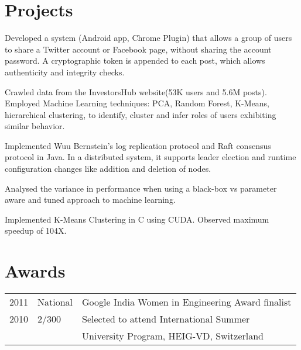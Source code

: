 \documentclass[]{deedy-resume-openfont}
\begin{document}
\begin{minipage}[t]{0.63\textwidth}
\section{Projects}
{\fontsize{9}{11}\selectfont
{}
Developed a system (Android app, Chrome Plugin) that
allows
a
group
of
users
to
share
a
Twitter
account
or
Facebook
page,
without
sharing
the
account
password.
A
cryptographic
token
is
appended
to
each
post,
which
allows authenticity and integrity checks.
\sectionsep

 Crawled
data
from
the
InvestorsHub
website(53K users and 5.6M posts).
Employed
Machine
Learning
techniques:
PCA,
Random
Forest,
K-Means,
hierarchical
clustering,
to
identify,
cluster
and
infer
roles
of
users
exhibiting
similar
behavior.

\sectionsep

Implemented Wuu Bernstein’s log replication protocol and Raft consensus protocol in Java. In a distributed system, it supports leader election and runtime configuration changes like addition and deletion of nodes.
\sectionsep

Analysed the variance in performance when using a black-box vs parameter aware and tuned approach to machine learning. \sectionsep

Implemented K-Means Clustering in C using CUDA. Observed maximum speedup of 104X.

}
\section{Awards} 
\begin{tabular}{rll}
2011	     & National  & Google
India
Women
in
Engineering
Award finalist\\
2010 & 2/300 & Selected to attend International Summer\\  & & University Program, HEIG-VD, Switzerland\\
\end{tabular}

\end{minipage} 
\end{document}
